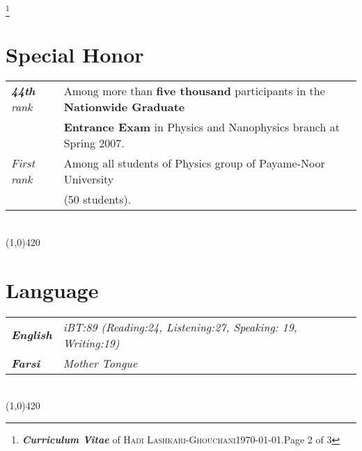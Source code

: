 \documentclass[10pt]{article}
\newcommand{\maxpages}{3}
\newcommand{\maxpages}{3}
\newcommand\HRule{\hspace*{.8cm}\line(1,0){420}\\}
\newenvironment{Record}[1]
{
    \vspace{-0.35cm}
    \section*{#1}
        \vspace{0.1cm}
        \begin{tabular}
}
{
        \end{tabular}\\
        \HRule
}
\newcommand{\FootNote}[1]{\let\thefootnote\relax\footnote{\textbf{\textit{Curriculum Vitae}} of \textsc{Hadi Lashkari-Ghouchani}\qquad\today.\qquad Page #1 of \maxpages}}
\begin{document}

\FootNote{2}

\newcommand{\SpecialHonor}[3]{
    \textsl{ #1}&#2\\
    &#3\\
}
\begin{Record}{Special Honor}{l l}
    \SpecialHonor{\textbf{44th} rank}
        {Among more than \textbf{five thousand} participants in the \textbf{Nationwide Graduate}}
        {\textbf{Entrance Exam} in Physics and Nanophysics branch at Spring 2007.}%
    \SpecialHonor{First rank}
        {Among all students of Physics group of Payame-Noor University}
        {(50 students).}%
\end{Record}


\newcommand{\Language}[2]{
    \textbf{\textsl{#1}}&\textit{#2}\\
}
\begin{Record}{Language}{l l}
    \Language{English}
        {iBT:89 (Reading:24, Listening:27, Speaking: 19, Writing:19)}%
    \Language{Farsi}{Mother Tongue}%
\end{Record}


\newcommand{\Research}[7]{
    \multicolumn{2}{l}{\textbf{\textsl{ #1:}}}\\
    \quad#2&\textit{#3}\\
    \ifthenelse{\isempty{#4}}
    {&\textit{#5}\\}
    {&#4: \textit{#5}\\}
    \ifthenelse{\isempty{#6}}
    {&\textit{#7}\\}
    {&#6: \textit{#7}\\}%
}
\end{document}
